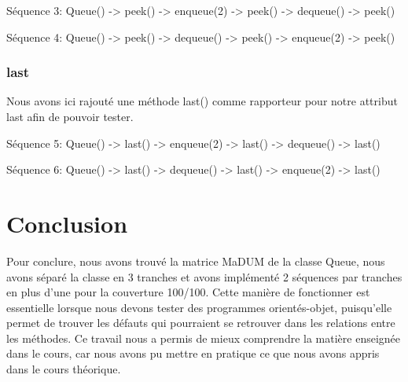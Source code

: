 \documentclass[11pt]{article}
\begin{document}
Séquence 3:
Queue() -> peek() -> enqueue(2) -> peek() -> dequeue() -> peek()

Séquence 4:
Queue() -> peek() -> dequeue() -> peek() -> enqueue(2) -> peek()

\subsubsection{last}

Nous avons ici rajouté une méthode last() comme rapporteur pour notre attribut last afin de pouvoir tester.

Séquence 5:
Queue() -> last() -> enqueue(2) -> last() -> dequeue() -> last()

Séquence 6:
Queue() -> last() -> dequeue() -> last() -> enqueue(2) -> last()

\section{Conclusion}
Pour conclure, nous avons trouvé la matrice MaDUM de la classe Queue, nous avons séparé la classe en 3 tranches et avons implémenté 2 séquences par tranches en plus d'une pour la couverture 100/100.
Cette manière de fonctionner est essentielle lorsque nous devons tester des programmes orientés-objet, puisqu'elle permet de trouver les défauts qui pourraient se retrouver dans les relations entre les méthodes.
Ce travail nous a permis de mieux comprendre la matière enseignée dans le cours, car nous avons pu mettre en pratique ce que nous avons appris dans le cours théorique.
\end{document}
